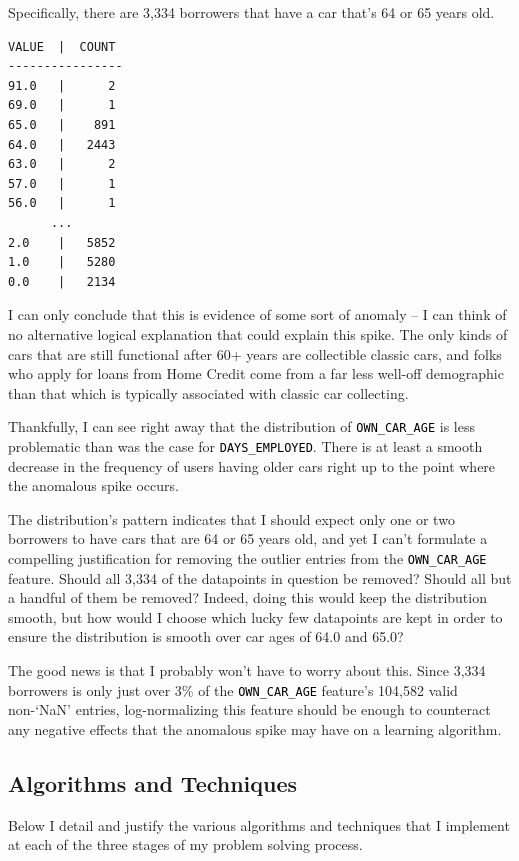 \documentclass[12pt, letterpaper]{article}
\begin{document}
Specifically, there are 3,334 borrowers that have a car that's 64 or 65 years old.

\begin{lstlisting}
VALUE  |  COUNT
----------------
91.0   |      2
69.0   |      1
65.0   |    891
64.0   |   2443
63.0   |      2
57.0   |      1
56.0   |      1
      ...
2.0    |   5852
1.0    |   5280
0.0    |   2134
\end{lstlisting}

I can only conclude that this is evidence of some sort of anomaly -- I can think of no alternative logical explanation that could explain this spike. The only kinds of cars that are still functional after 60+ years are collectible classic cars, and folks who apply for loans from Home Credit come from a far less well-off demographic than that which is typically associated with classic car collecting.

Thankfully, I can see right away that the distribution of \colorbox{backcolor}{\textcolor{black}{\texttt{OWN_CAR_AGE}}} is less problematic than was the case for \colorbox{backcolor}{\textcolor{black}{\texttt{DAYS_EMPLOYED}}}. There is at least a smooth decrease in the frequency of users having older cars right up to the point where the anomalous spike occurs.

The distribution's pattern indicates that I should expect only one or two borrowers to have cars that are 64 or 65 years old, and yet I can't formulate a compelling justification for removing the outlier entries from the \colorbox{backcolor}{\textcolor{black}{\texttt{OWN_CAR_AGE}}} feature. Should all 3,334 of the datapoints in question be removed? Should all but a handful of them be removed? Indeed, doing this would keep the distribution smooth, but how would I choose which lucky few datapoints are kept in order to ensure the distribution is smooth over car ages of 64.0 and 65.0?

The good news is that I probably won't have to worry about this. Since 3,334 borrowers is only just over 3\% of the \colorbox{backcolor}{\textcolor{black}{\texttt{OWN_CAR_AGE}}} feature's 104,582 valid non-`NaN' entries, log-normalizing this feature should be enough to counteract any negative effects that the anomalous spike may have on a learning algorithm.

\subsection{Algorithms and Techniques}
Below I detail and justify the various algorithms and techniques that I implement at each of the three stages of my problem solving process.
\end{document}
